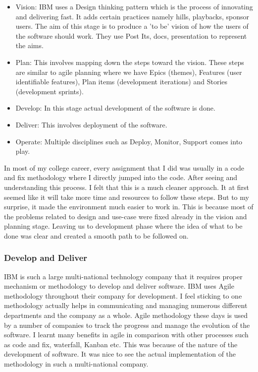 \begin{itemize}
    \item Vision: IBM uses a Design thinking pattern which is the process of innovating and delivering fast. It adds certain practices namely hills, playbacks, sponsor users. The aim of this stage is to produce a 'to be' vision of how the users of the software should work. They use Post Its, docs, presentation to represent the aims. 
    \item Plan: This involves mapping down the steps toward the vision. These steps are similar to agile planning where we have Epics (themes), Features (user identifiable features), Plan items (development iterations) and Stories (development sprints).
    \item Develop: In this stage actual development of the software is done.
    \item Deliver: This involves deployment of the software.
    \item Operate: Multiple disciplines such as Deploy, Monitor, Support comes into play.
\end{itemize}

In most of my college career, every assignment that I did was usually in a code and fix methodology where I directly jumped into the code. After seeing and understanding this process. I felt that this is a much cleaner approach. It at first seemed like it will take more time and resources to follow these steps. But to my surprise, it made the environment much easier to work in. This is because most of the problems related to design and use-case were fixed already in the vision and planning stage. Leaving us to development phase where the idea of what to be done was clear and created a smooth path to be followed on.

\subsubsection{Develop and Deliver}

IBM is such a large multi-national technology company that it requires proper mechanism or methodology to develop and deliver software. IBM uses Agile methodology throughout their company for development. I feel sticking to one methodology actually helps in communicating and managing numerous different departments and the company as a whole. Agile methodology these days is used by a number of companies to track the progress and manage the evolution of the software. I learnt many benefits in agile in comparison with other processes such as code and fix, waterfall, Kanban etc. This was because of the nature of the development of software. It was nice to see the actual implementation of the methodology in such a multi-national company. 

